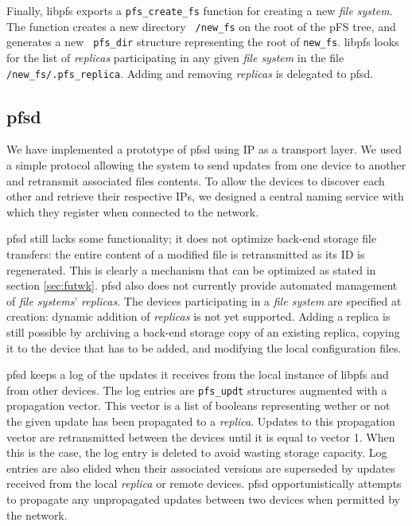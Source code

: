 Finally, libpfs exports a {\tt pfs\_create\_fs} function for creating
a new \emph{file system}. The function creates a new directory {\tt
  /new\_fs} on the root of the pFS tree, and generates a new {\tt
  pfs\_dir} structure representing the root of {\tt new\_fs}. libpfs
looks for the list of \emph{replicas} participating in any given
\emph{file system} in the file {\tt /new\_fs/.pfs\_replica}. Adding
and removing \emph{replicas} is delegated to pfsd.


\subsection {pfsd}

We have implemented a prototype of pfsd using IP as a transport layer.
We used a simple protocol allowing the system to send updates from one
device to another and retransmit associated files contents. To allow
the devices to discover each other and retrieve their respective IPs,
we designed a central naming service with which they register when
connected to the network.

pfsd still lacks some functionality; it does not optimize back-end
storage file transfers: the entire content of a modified file is
retransmitted as its ID is regenerated. This is clearly a mechanism
that can be optimized as stated in section \ref{sec:futwk}. pfsd
also does not currently provide automated management of \emph{file
  systems}' \emph{replicas}. The devices participating in a \emph{file
  system} are specified at creation: dynamic addition of
\emph{replicas} is not yet supported. Adding a replica is still
possible by archiving a back-end storage copy of an existing replica,
copying it to the device that has to be added, and modifying the local
configuration files.

pfsd keeps a log of the updates it receives from the local instance of
libpfs and from other devices. The log entries are {\tt pfs\_updt}
structures augmented with a propagation vector. This vector is a list
of booleans representing wether or not the given update has been
propagated to a \emph{replica}. Updates to this propagation vector are
retransmitted between the devices until it is equal to vector 1.  When
this is the case, the log entry is deleted to avoid wasting storage
capacity. Log entries are also elided when their associated versions
are superseded by updates received from the local \emph{replica} or
remote devices.  pfsd opportunistically attempts to propagate any
unpropagated updates between two devices when permitted by the
network.

